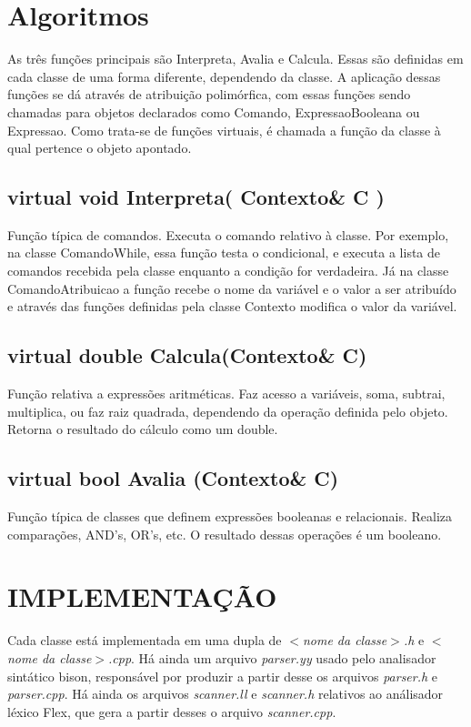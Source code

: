 \documentclass[12pt]{article}
\begin{document}
\section{Algoritmos}

As três funções principais são Interpreta, Avalia e Calcula. Essas são definidas
em cada classe de uma forma diferente, dependendo da classe. A aplicação dessas
funções se dá através de atribuição polimórfica, com essas funções sendo
chamadas para objetos declarados como Comando, ExpressaoBooleana ou Expressao.
Como trata-se de funções virtuais, é chamada a função da classe à qual pertence
o objeto apontado.

\subsection{virtual void Interpreta( Contexto\& C )}

Função típica de comandos. Executa o comando relativo à classe. Por exemplo, na classe ComandoWhile, essa função testa o condicional, e executa a lista de comandos recebida pela classe enquanto a condição for verdadeira. Já na classe ComandoAtribuicao a função recebe o nome da variável e o valor a ser atribuído e através das funções definidas pela classe Contexto modifica o valor da variável.


\subsection{virtual double Calcula(Contexto\& C)}

Função relativa a expressões aritméticas. Faz acesso a variáveis, soma, subtrai, multiplica, ou faz raiz quadrada, dependendo da operação definida pelo objeto. Retorna o resultado do cálculo como um double.

\subsection{virtual bool Avalia (Contexto\& C)}

Função típica de classes que definem expressões booleanas e relacionais. Realiza comparações, AND's, OR's, etc. O resultado dessas operações é um booleano.

\section{IMPLEMENTAÇÃO}

Cada classe está implementada em uma dupla de \textit{$<$nome da classe$>$.h} e
\textit{$<$nome da classe$>$.cpp}. Há ainda um arquivo \textit{parser.yy} usado pelo
analisador sintático bison, responsável por produzir a partir desse os arquivos
\textit{parser.h} e \textit{parser.cpp}. Há ainda os arquivos \textit{scanner.ll} e \textit{scanner.h} relativos ao análisador léxico Flex, que gera a partir desses o arquivo \textit{scanner.cpp}.
\end{document}
